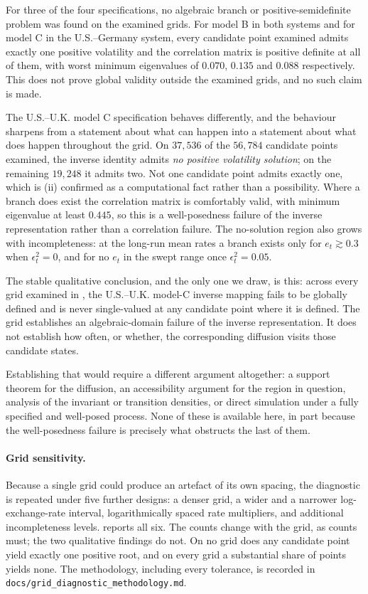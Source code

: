 \documentclass[11pt]{article}
\theoremstyle{definition}
\begin{document}
For three of the four specifications, no algebraic branch or positive-semidefinite problem was found on the examined grids. For model B in both systems and for model C in the U.S.--Germany system, every candidate point examined admits exactly one positive volatility and the correlation matrix is positive definite at all of them, with worst minimum eigenvalues of $0.070$, $0.135$ and $0.088$ respectively. This does not prove global validity outside the examined grids, and no such claim is made.

The U.S.--U.K. model C specification behaves differently, and the behaviour sharpens  from a statement about what can happen into a statement about what does happen throughout the grid. On $37{,}536$ of the $56{,}784$ candidate points examined, the inverse identity admits \emph{no positive volatility solution}; on the remaining $19{,}248$ it admits two. Not one candidate point admits exactly one, which is (ii) confirmed as a computational fact rather than a possibility. Where a branch does exist the correlation matrix is comfortably valid, with minimum eigenvalue at least $0.445$, so this is a well-posedness failure of the inverse representation rather than a correlation failure. The no-solution region also grows with incompleteness: at the long-run mean rates a branch exists only for $e_t\gtrsim0.3$ when $\epsilon_t^2=0$, and for no $e_t$ in the swept range once $\epsilon_t^2=0.05$.

The stable qualitative conclusion, and the only one we draw, is this: across every grid examined in , the U.S.--U.K. model-C inverse mapping fails to be globally defined and is never single-valued at any candidate point where it is defined. The grid establishes an algebraic-domain failure of the inverse representation. It does not establish how often, or whether, the corresponding diffusion visits those candidate states.

Establishing that would require a different argument altogether: a support theorem for the diffusion, an accessibility argument for the region in question, analysis of the invariant or transition densities, or direct simulation under a fully specified and well-posed process. None of these is available here, in part because the well-posedness failure is precisely what obstructs the last of them.

\paragraph{Grid sensitivity.} Because a single grid could produce an artefact of its own spacing, the diagnostic is repeated under five further designs: a denser grid, a wider and a narrower log-exchange-rate interval, logarithmically spaced rate multipliers, and additional incompleteness levels.  reports all six. The counts change with the grid, as counts must; the two qualitative findings do not. On no grid does any candidate point yield exactly one positive root, and on every grid a substantial share of points yields none. The methodology, including every tolerance, is recorded in \texttt{docs/grid\_diagnostic\_methodology.md}.
\end{document}
